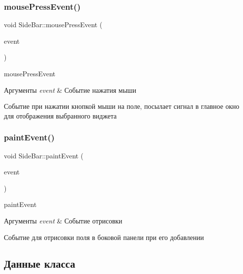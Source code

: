 \subsubsection{\texorpdfstring{mouse\+Press\+Event()}{mousePressEvent()}}
{\footnotesize\ttfamily void Side\+Bar\+::mouse\+Press\+Event (\begin{DoxyParamCaption}\item[{Q\+Mouse\+Event $\ast$}]{event }\end{DoxyParamCaption})\hspace{0.3cm}{\ttfamily [protected]}}



mouse\+Press\+Event 


\begin{DoxyParams}{Аргументы}
{\em event} & Событие нажатия мыши\\
\hline
\end{DoxyParams}
Событие при нажатии кнопкой мыши на поле, посылает сигнал в главное окно для отображения выбранного виджета \mbox{\label{classSideBar_a99c8319ee78b2197db5eda7b2cd232a1}} 
\subsubsection{\texorpdfstring{paint\+Event()}{paintEvent()}}
{\footnotesize\ttfamily void Side\+Bar\+::paint\+Event (\begin{DoxyParamCaption}\item[{Q\+Paint\+Event $\ast$}]{event }\end{DoxyParamCaption})\hspace{0.3cm}{\ttfamily [protected]}}



paint\+Event 


\begin{DoxyParams}{Аргументы}
{\em event} & Событие отрисовки\\
\hline
\end{DoxyParams}
Событие для отрисовки поля в боковой панели при его добавлении 

\subsection{Данные класса}
\mbox{\label{classSideBar_aeb09886c01726197d79d417ce22322d4}} 
